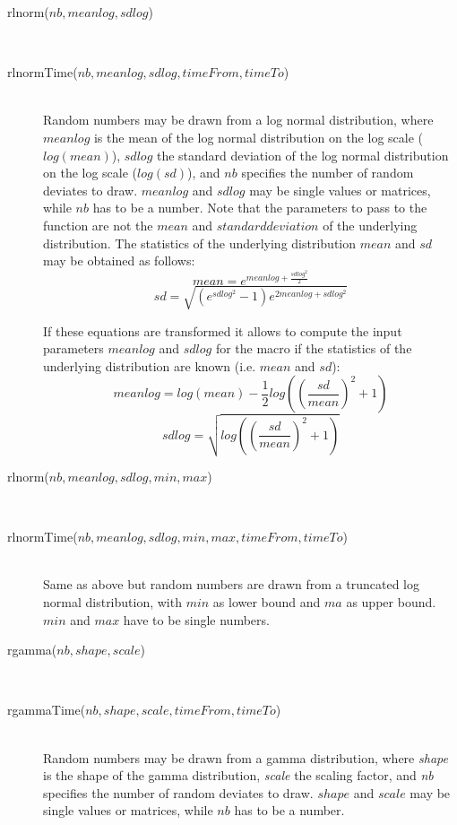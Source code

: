 \documentclass[letterpaper,12pt,oneside]{book}
\begin{document}
\begin{description}
\item[rlnorm($nb, meanlog, sdlog$)]\hspace*{\fill}\\
\vspace{-9mm}
\item[rlnormTime($nb, meanlog, sdlog, timeFrom, timeTo$)]\hspace*{\fill}\\
Random numbers may be drawn from a log normal distribution, where $meanlog$ is the mean of the log normal distribution on the log scale ($log(mean)$), $sdlog$ the standard deviation of the log normal distribution on the log scale ($log(sd)$), and $nb$ specifies the number of random deviates to draw. $meanlog$ and $sdlog$ may be single values or matrices, while $nb$ has to be a number. Note that the parameters to pass to the function are not the $mean$ and $standard deviation$ of the underlying distribution. The statistics of the underlying distribution $mean$ and $sd$ may be obtained as follows:
    \[mean = e^{meanlog+\frac{sdlog^{2}}{2}}  \]
    \[sd = \sqrt{(e^{sdlog^{2}}-1)e^{2meanlog+sdlog^{2}}} \]
  
If these equations are transformed it allows to compute the input parameters $meanlog$ and $sdlog$ for the macro if the statistics of the underlying distribution are known (i.e. $mean$ and $sd$):
    \[meanlog = log\left(mean\right)-\frac{1}{2}log\left(\left(\frac{sd}{mean}\right)^2+1\right) \]
    \[sdlog = \sqrt{log\left(\left(\frac{sd}{mean}\right)^2+1\right)} \]

\item[rlnorm($nb, meanlog, sdlog, min, max$)]\hspace*{\fill}\\
\vspace{-9mm}
\item[rlnormTime($nb, meanlog, sdlog, min, max, timeFrom, timeTo$)]\hspace*{\fill}\\
Same as above but random numbers are drawn from a truncated log normal distribution, with $min$ as lower bound and $ma$ as upper bound. $min$ and $max$ have to be single numbers.

\item[rgamma($nb, shape, scale$)]\hspace*{\fill}\\
\vspace{-9mm}
\item[rgammaTime($nb, shape, scale, timeFrom, timeTo$)]\hspace*{\fill}\\
Random numbers may be drawn from a gamma distribution, where \textit{shape} is the shape of the gamma distribution, \textit{scale} the scaling factor, and \textit{nb} specifies the number of random deviates to draw. $shape$ and $scale$ may be single values or matrices, while $nb$ has to be a number.


\end{description}
\end{document}
